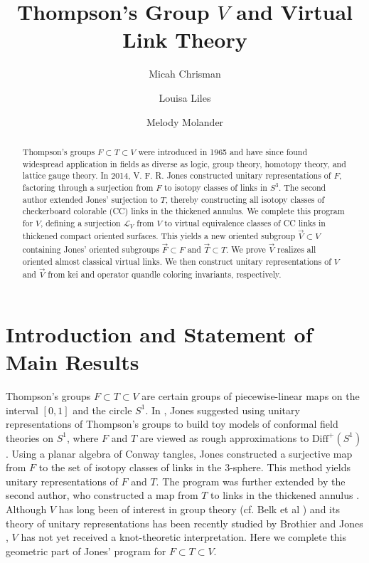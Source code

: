 \documentclass[11pt, twoside]{amsart}
\title[]{Thompson's Group $V$ and Virtual Link Theory}
\author[M. Chrisman]{Micah Chrisman}
\author[L. Liles]{Louisa Liles}
\author[M. Molander]{Melody Molander}
\numberwithin{equation}{section}
\theoremstyle{definition}
\numberwithin{equation}{section}
\begin{document}
\begin{abstract} 
Thompson’s groups $F \subset T \subset V$ were introduced in 1965 and have since found widespread application in fields as diverse as logic, group theory, homotopy theory, and lattice gauge theory. In 2014, V. F. R. Jones constructed unitary representations of $F$, factoring through a surjection from $F$ to isotopy classes of links in $S^3$. The second author extended Jones’ surjection to $T$, thereby constructing all isotopy classes of checkerboard colorable (CC) links in the thickened annulus. We complete this program for $V$, defining a surjection $\mathscr{L}_{V}$ from $V$ to virtual equivalence classes of CC links in thickened compact oriented surfaces. This yields a new oriented subgroup $\vec{V} \subset V$ containing Jones' oriented subgroups $\vec{F} \subset F$ and $\vec{T}\subset T$. We prove $\vec{V}$ realizes all oriented almost classical virtual links. We then construct unitary representations of $V$ and $\vec{V}$ from kei and operator quandle coloring invariants, respectively. 
\end{abstract}



\maketitle

\section{Introduction and Statement of Main Results}

Thompson's groups $F \subset T \subset V$ are certain groups of piecewise-linear maps on the interval $[0,1]$ and the circle $S^1$. In \cite{jones_unitary}, Jones suggested using unitary representations of Thompson's groups to build toy models of conformal field theories on $S^1$, where $F$ and $T$ are viewed as rough approximations to $\text{Diff}^+(S^1)$. Using a planar algebra of Conway tangles, Jones constructed a surjective map from $F$ to the set of isotopy classes of links in the $3$-sphere. This method yields unitary representations of $F$ and $T$. The program was further extended by the second author, who constructed a map from $T$ to links in the thickened annulus \cite{LL25}. Although $V$ has long been of interest in group theory (cf. Belk et al \cite{BBQS}) and its theory of unitary representations has been recently studied by Brothier and Jones \cite{brothier_jones_a,brothier_jones_b,brothier_classification}, $V$ has not yet received a knot-theoretic interpretation. Here we complete this geometric part of Jones' program for $F\subset T \subset V$.
\end{document}
